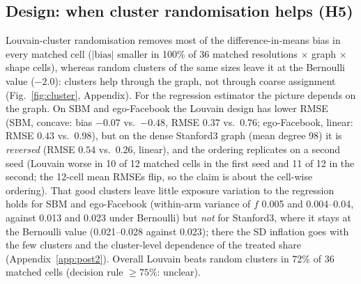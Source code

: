 \subsection{Design: when cluster randomisation helps (H5)}
\label{sec:res-design}
Louvain-cluster randomisation removes most of the difference-in-means bias in every matched cell ($|\text{bias}|$ smaller in 100\% of 36 matched resolutions $\times$ graph $\times$ shape cells), whereas random clusters of the same sizes leave it at the Bernoulli value ($-2.0$): clusters help through the graph, not through coarse assignment (Fig.~\ref{fig:cluster}, Appendix). For the regression estimator the picture depends on the graph. On SBM and ego-Facebook the Louvain design has lower RMSE (SBM, concave: bias $-0.07$ vs.\ $-0.48$, RMSE $0.37$ vs.\ $0.76$; ego-Facebook, linear: RMSE $0.43$ vs.\ $0.98$), but on the dense Stanford3 graph (mean degree 98) it is \emph{reversed} (RMSE $0.54$ vs.\ $0.26$, linear), and the ordering replicates on a second seed (Louvain worse in 10 of 12 matched cells in the first seed and 11 of 12 in the second; the 12-cell mean RMSEs flip, so the claim is about the cell-wise ordering). That good clusters leave little exposure variation to the regression holds for SBM and ego-Facebook (within-arm variance of $f$ 0.005 and 0.004--0.04, against 0.013 and 0.023 under Bernoulli) but \emph{not} for Stanford3, where it stays at the Bernoulli value (0.021--0.028 against 0.023); there the SD inflation goes with the few clusters and the cluster-level dependence of the treated share (Appendix~\ref{app:post2}). Overall Louvain beats random clusters in 72\% of 36 matched cells (decision rule $\ge75\%$: unclear).

